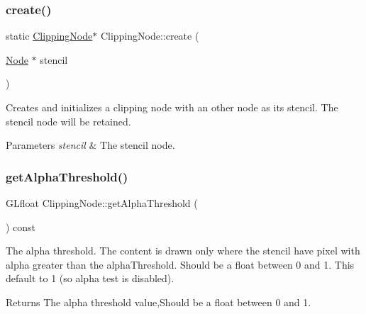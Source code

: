 \subsubsection{\texorpdfstring{create()}{create()}\hspace{0.1cm}{\footnotesize\ttfamily [4/4]}}
{\footnotesize\ttfamily static \hyperlink{classClippingNode}{Clipping\+Node}$\ast$ Clipping\+Node\+::create (\begin{DoxyParamCaption}\item[{\hyperlink{classNode}{Node} $\ast$}]{stencil }\end{DoxyParamCaption})\hspace{0.3cm}{\ttfamily [static]}}

Creates and initializes a clipping node with an other node as its stencil. The stencil node will be retained. 
\begin{DoxyParams}{Parameters}
{\em stencil} & The stencil node. \\
\hline
\end{DoxyParams}
\mbox{\label{classClippingNode_a3b16e238ab1a53986857f9335a5a3147}} 
\subsubsection{\texorpdfstring{get\+Alpha\+Threshold()}{getAlphaThreshold()}\hspace{0.1cm}{\footnotesize\ttfamily [1/2]}}
{\footnotesize\ttfamily G\+Lfloat Clipping\+Node\+::get\+Alpha\+Threshold (\begin{DoxyParamCaption}{ }\end{DoxyParamCaption}) const}

The alpha threshold. The content is drawn only where the stencil have pixel with alpha greater than the alpha\+Threshold. Should be a float between 0 and 1. This default to 1 (so alpha test is disabled).

\begin{DoxyReturn}{Returns}
The alpha threshold value,Should be a float between 0 and 1. 
\end{DoxyReturn}
\mbox{\label{classClippingNode_a3b16e238ab1a53986857f9335a5a3147}} 

